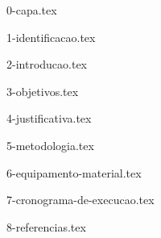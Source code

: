 \documentclass[12pt,nodisplayskipstretch]{article}
\begin{document}


{0-capa.tex}

{1-identificacao.tex}

{2-introducao.tex}

{3-objetivos.tex}

{4-justificativa.tex}

{5-metodologia.tex}

{6-equipamento-material.tex}

{7-cronograma-de-execucao.tex}

{8-referencias.tex}
\end{document}
